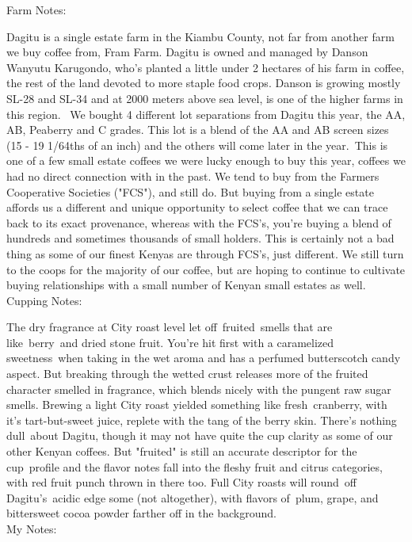 \documentclass[10pt,twoside,footinclude=true,headinclude=true]{scrbook} %
\newlength{\mysize}
\newcommand{\myfontsize}[1]{
  \setlength{\mysize}{#1pt}
  \fontsize{\mysize}{1.2\mysize}
  \selectfont
}
\begin{document}

\newpage
\vspace*{-2.2em}
\raggedright
\normalsize
Farm Notes: \\
\myfontsize{8}
Dagitu is a single estate farm in the Kiambu County, not far from another farm we buy coffee from, Fram Farm. Dagitu is owned and managed by Danson Wanyutu Karugondo, who's planted a little under 2 hectares of his farm in coffee, the rest of the land devoted to more staple food crops. Danson is growing mostly SL-28 and SL-34 and at 2000 meters above sea level, is one of the higher farms in this region.  We bought 4 different lot separations from Dagitu this year, the AA, AB, Peaberry and C grades. This lot is a blend of the AA and AB screen sizes (15 - 19 1/64ths of an inch) and the others will come later in the year. This is one of a few small estate coffees we were lucky enough to buy this year, coffees we had no direct connection with in the past. We tend to buy from the Farmers Cooperative Societies ("FCS"), and still do. But buying from a single estate affords us a different and unique opportunity to select coffee that we can trace back to its exact provenance, whereas with the FCS's, you're buying a blend of hundreds and sometimes thousands of small holders. This is certainly not a bad thing as some of our finest Kenyas are through FCS's, just different. We still turn to the coops for the majority of our coffee, but are hoping to continue to cultivate buying relationships with a small number of Kenyan small estates as well. \\
\medskip
\normalsize
Cupping Notes: \\
\myfontsize{8}
The dry fragrance at City roast level let off fruited smells that are like berry and dried stone fruit. You're hit first with a caramelized sweetness when taking in the wet aroma and has a perfumed butterscotch candy aspect. But breaking through the wetted crust releases more of the fruited character smelled in fragrance, which blends nicely with the pungent raw sugar smells. Brewing a light City roast yielded something like fresh cranberry, with it's tart-but-sweet juice, replete with the tang of the berry skin. There's nothing dull about Dagitu, though it may not have quite the cup clarity as some of our other Kenyan coffees. But "fruited" is still an accurate descriptor for the cup profile and the flavor notes fall into the fleshy fruit and citrus categories, with red fruit punch thrown in there too. Full City roasts will round off Dagitu's acidic edge some (not altogether), with flavors of plum, grape, and bittersweet cocoa powder farther off in the background. \\
\medskip
\normalsize
My Notes:
\end{document}
